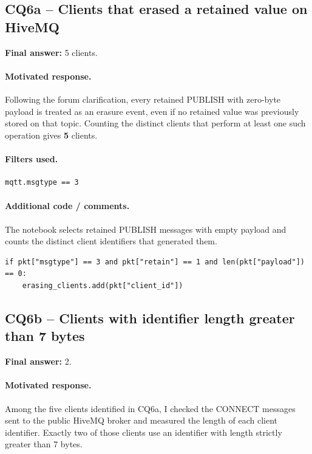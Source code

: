 \documentclass[11pt,a4paper]{article}
\begin{document}
\subsection*{CQ6a -- Clients that erased a retained value on HiveMQ}

\textbf{Final answer:} 5 clients.

\paragraph{Motivated response.}
Following the forum clarification, every retained PUBLISH with zero-byte payload is treated as
an erasure event, even if no retained value was previously stored on that topic. Counting the
distinct clients that perform at least one such operation gives \textbf{5} clients.

\paragraph{Filters used.}
\begin{verbatim}
mqtt.msgtype == 3
\end{verbatim}

\paragraph{Additional code / comments.}
The notebook selects retained PUBLISH messages with empty payload and counts the distinct
client identifiers that generated them.

\begin{verbatim}
if pkt["msgtype"] == 3 and pkt["retain"] == 1 and len(pkt["payload"]) == 0:
    erasing_clients.add(pkt["client_id"])
\end{verbatim}
\subsection*{CQ6b -- Clients with identifier length greater than 7 bytes}

\textbf{Final answer:} 2.

\paragraph{Motivated response.}
Among the five clients identified in CQ6a, I checked the CONNECT messages sent to the public
HiveMQ broker and measured the length of each client identifier. Exactly two of those clients
use an identifier with length strictly greater than 7 bytes.
\end{document}
